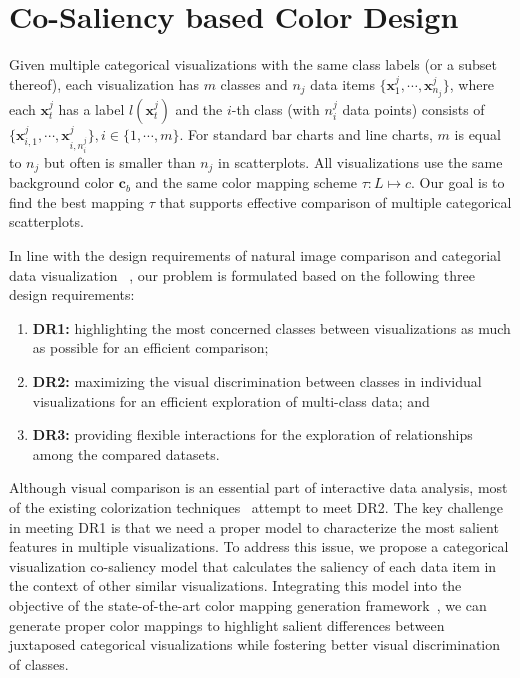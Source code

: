 \section{Co-Saliency based Color Design}
Given multiple categorical visualizations with the same class labels (or a subset thereof), each visualization has $m$ classes and $n_j$ data items $\{\mathbf{x}^j_1, \cdots, \mathbf{x}^j_{n_j}\}$, where each $\mathbf{x}^j_t$ has a label
$l(\mathbf{x}^j_t)$ and the $i$-th class (with $n^j_i$ data points) consists of $\{\mathbf{x}_{i,1}^j, \cdots , \mathbf{x}_{i,n^j_i}^j\}, i \in  \{ 1, \cdots, m \} $.
For standard bar charts and line charts, $m$ is equal to $n_j$ but often is smaller than $n_j$ in scatterplots.
All visualizations use the same  background color $\mathbf{c}_b$ and the same color mapping scheme $\tau: L \mapsto c$. Our goal is to find the best mapping $\tau$ that supports effective comparison of multiple categorical scatterplots.

In line with the design requirements of natural image comparison and categorial data visualization ~\cite{Jacobs10,Gleicher18,Lu21},
our problem is formulated based on the following three design requirements:
\begin{enumerate}[label=(\roman*),nosep]
\item \textbf{DR1:} highlighting the most concerned classes between visualizations as much as possible for an efficient comparison;
\item \textbf{DR2:} maximizing the visual discrimination between classes in individual visualizations for an efficient exploration of multi-class data; and
\item \textbf{DR3:} providing flexible interactions for the exploration of relationships among the compared datasets.
\end{enumerate}
Although visual comparison is an essential part of interactive data analysis, most of  the existing  colorization techniques~\cite{Gramazio17, Lu21} attempt to meet DR2. The key challenge in meeting DR1 is that we need a proper model to characterize the most salient features in multiple visualizations.
To address this issue, we propose a categorical visualization co-saliency model that calculates the saliency of each data item in the context of other similar visualizations. Integrating this model into the objective of the state-of-the-art color mapping generation framework~\cite{Lu21}, we can
generate proper color mappings to highlight salient differences between juxtaposed categorical visualizations while fostering better visual discrimination of classes.


